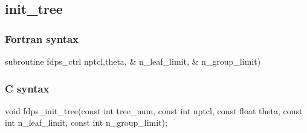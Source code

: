 \subsection{init\_tree}
\subsubsection*{Fortran syntax}
\begin{screen}
\begin{spverbatim}
subroutine fdps_ctrl%
                               nptcl,theta,  &
                               n_leaf_limit, &
                               n_group_limit)
\end{spverbatim}
\end{screen}

\subsubsection*{C syntax}
\begin{screen}
\begin{spverbatim}
void fdps_init_tree(const int tree_num,
                    const int nptcl,
                    const float theta,
                    const int n_leaf_limit,
                    const int n_group_limit);
\end{spverbatim}
\end{screen}

\clearpage

